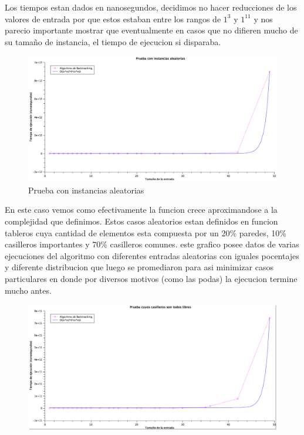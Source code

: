 Los tiempos estan dados en nanosegundos, decidimos no hacer reducciones de los valores de entrada por que estos estaban entre los rangos de $1^{3}$ y $1^{11}$ y nos parecio importante mostrar que eventualmente en casos que no difieren mucho de su tamaño de instancia, el tiempo de ejecucion si disparaba.

\begin{figure}[H] %
\begin{center}
\includegraphics[width=460pt]{../imgs/graficoej3_aleatorio.png}
\end{center}
\caption{Prueba con instancias aleatorias}
\end{figure}

En este caso vemos como efectivamente la funcion crece aproximandose a la complejidad que definimos. Estos casos aleatorios estan definidos en funcion tableros cuya cantidad de elementos esta compuesta por un 20\% paredes, 10\% casilleros importantes y 70\% casilleros comunes. este grafico posee datos de varias ejecuciones del algoritmo con diferentes entradas aleatorias con iguales pocentajes y diferente distribucion que luego se promediaron para asi minimizar casos particulares en donde por diversos motivos (como las podas) la ejecucion termine mucho antes.


\begin{figure}[H] %
\begin{center}
\includegraphics[width=460pt]{../imgs/graficoej3_todosUno.png}
\end{center}
\end{figure}

